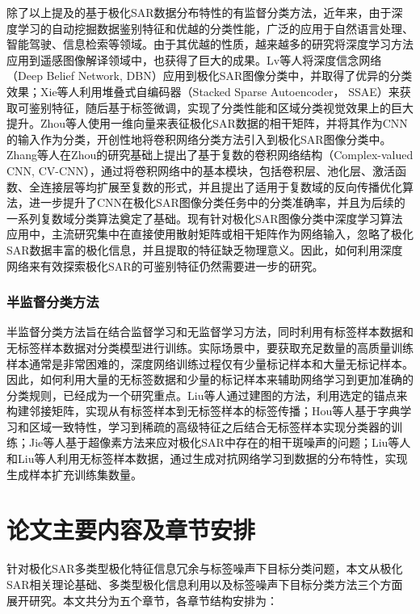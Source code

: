除了以上提及的基于极化SAR数据分布特性的有监督分类方法，近年来，由于深度学习的自动挖掘数据鉴别特征和优越的分类性能，广泛的应用于自然语言处理、智能驾驶、信息检索等领域。由于其优越的性质，越来越多的研究将深度学习方法应用到遥感图像解译领域中，也获得了巨大的成果。Lv等人将深度信念网络（Deep Belief Network, DBN）应用到极化SAR图像分类中，并取得了优异的分类效果；Xie等人利用堆叠式自编码器（Stacked Sparse Autoencoder， SSAE）来获取可鉴别特征，随后基于标签微调，实现了分类性能和区域分类视觉效果上的巨大提升。Zhou等人使用一维向量来表征极化SAR数据的相干矩阵，并将其作为CNN的输入作为分类，开创性地将卷积网络分类方法引入到极化SAR图像分类中。Zhang等人在Zhou的研究基础上提出了基于复数的卷积网络结构（Complex-valued CNN, CV-CNN），通过将卷积网络中的基本模块，包括卷积层、池化层、激活函数、全连接层等均扩展至复数的形式，并且提出了适用于复数域的反向传播优化算法，进一步提升了CNN在极化SAR图像分类任务中的分类准确率，并且为后续的一系列复数域分类算法奠定了基础。现有针对极化SAR图像分类中深度学习算法应用中，主流研究集中在直接使用散射矩阵或相干矩阵作为网络输入，忽略了极化SAR数据丰富的极化信息，并且提取的特征缺乏物理意义。因此，如何利用深度网络来有效探索极化SAR的可鉴别特征仍然需要进一步的研究。

\subsubsection{半监督分类方法}
半监督分类方法旨在结合监督学习和无监督学习方法，同时利用有标签样本数据和无标签样本数据对分类模型进行训练。实际场景中，要获取充足数量的高质量训练样本通常是非常困难的，深度网络训练过程仅有少量标记样本和大量无标记样本。因此，如何利用大量的无标签数据和少量的标记样本来辅助网络学习到更加准确的分类规则，已经成为一个研究重点。Liu等人通过建图的方法，利用选定的锚点来构建邻接矩阵，实现从有标签样本到无标签样本的标签传播；Hou等人基于字典学习和区域一致特性，学习到稀疏的高级特征之后结合无标签样本实现分类器的训练；Jie等人基于超像素方法来应对极化SAR中存在的相干斑噪声的问题；Liu等人和Liu等人利用无标签样本数据，通过生成对抗网络学习到数据的分布特性，实现生成样本扩充训练集数量。

\section{论文主要内容及章节安排}
针对极化SAR多类型极化特征信息冗余与标签噪声下目标分类问题，本文从极化SAR相关理论基础、多类型极化信息利用以及标签噪声下目标分类方法三个方面展开研究。本文共分为五个章节，各章节结构安排为：

